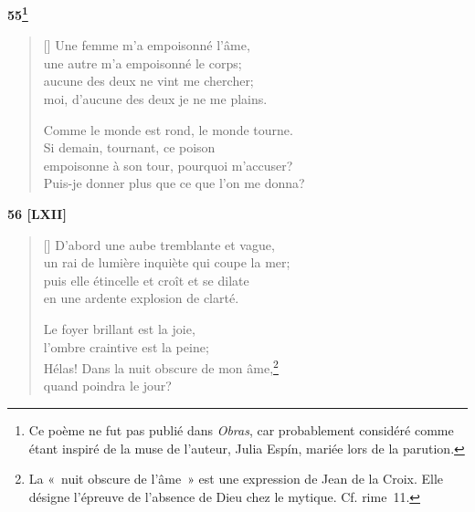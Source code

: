 \documentclass[a4paper,12pt]{book}
\begin{document}
\bigskip

\begin{center}
  \textbf{55\footnote{Ce poème ne fut pas publié dans \emph{Obras},
    car probablement considéré comme étant inspiré de la muse
    de l'auteur, Julia Espín, mariée lors de la parution.}}
\end{center}

\settowidth{\versewidth}{Puis-je donner plus que ce que l'on me donna?}

\begin{verse}[\versewidth]
  Une femme m'a empoisonné l'âme, \\
  une autre m'a empoisonné le corps; \\
  aucune des deux ne vint me chercher; \\
  moi, d'aucune des deux je ne me plains.

  Comme le monde est rond, le monde tourne. \\
  Si demain, tournant, ce poison \\
  empoisonne à son tour, pourquoi m'accuser? \\
  Puis-je donner plus que ce que l'on me donna?
\end{verse}

\bigskip

\begin{center}
  \textbf{56 [LXII]}
\end{center}

\settowidth{\versewidth}{puis elle étincelle et croît et se dilate}

\begin{verse}[\versewidth]
  D'abord une aube tremblante et vague, \\
  un rai de lumière inquiète qui coupe la mer; \\
  puis elle étincelle et croît et se dilate \\
  en une ardente explosion de clarté.

  Le foyer brillant est la joie, \\
  l'ombre craintive est la peine; \\
  Hélas! Dans la nuit obscure de mon âme,\footnote{La «~nuit obscure de
  l'âme~» est une expression de Jean de la Croix. Elle
  désigne l'épreuve de l'absence de Dieu chez le
  mytique. Cf. rime~11.} \\
  quand poindra le jour?
\end{verse}
\end{document}
